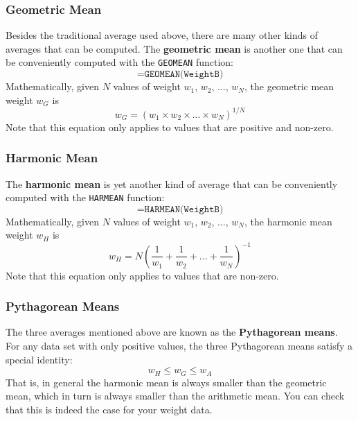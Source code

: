 \subsubsection{Geometric Mean}
%
Besides the traditional average used above, there are many other kinds of averages that can be computed. The \textbf{geometric mean} is another one that can be conveniently computed with the \texttt{GEOMEAN} function:
\begin{equation}
    \texttt{=GEOMEAN(WeightB)}
\end{equation}
Mathematically, given $N$ values of weight $w_{1}$, $w_{2}$, ..., $w_{N}$, the geometric mean weight $w_{G}$ is
\begin{equation}
    w_{G} = \left( w_{1} \times w_{2} \times ... \times w_{N} \right)^{1/N}
\end{equation}
Note that this equation only applies to values that are positive and non-zero.
%
\subsubsection{Harmonic Mean}
%
The \textbf{harmonic mean} is yet another kind of average that can be conveniently computed with the \texttt{HARMEAN} function:
\begin{equation}
    \texttt{=HARMEAN(WeightB)}
\end{equation}
Mathematically, given $N$ values of weight $w_{1}$, $w_{2}$, ..., $w_{N}$, the harmonic mean weight $w_{H}$ is
\begin{equation}
    w_{H} = N \left( \frac{1}{w_{1}} + \frac{1}{w_{2}} + ... + \frac{1}{w_{N}} \right)^{-1}
\end{equation}
Note that this equation only applies to values that are non-zero.
%
\subsubsection{Pythagorean Means}
%
The three averages mentioned above are known as the \textbf{Pythagorean means}. For any data set with only positive values, the three Pythagorean means satisfy a special identity:
\begin{equation}
    w_{H} \leq w_{G} \leq w_{A}
\end{equation}
That is, in general the harmonic mean is always smaller than the geometric mean, which in turn is always smaller than the arithmetic mean. You can check that this is indeed the case for your weight data.
%
